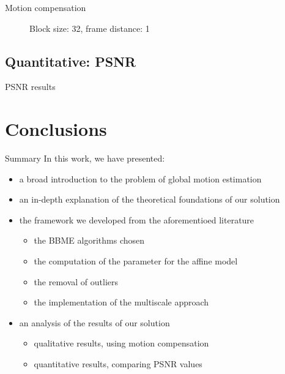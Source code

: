 \documentclass[aspectratio=1610,xcolor=dvipsnames]{beamer}
\begin{document}
\begin{frame}{Motion compensation}
\begin{figure}[htbp]
        \caption{Block size: 32, frame distance: 1}
    \end{figure}
\end{frame}

\subsection{Quantitative: PSNR}
\begin{frame}{PSNR results}
    \begin{table}
        \label{tab:psnr}
        
        \caption{PSNR result on a some example video sequences}
    \end{table}    
\end{frame}


\section{Conclusions}
\begin{frame}
    \begin{block}{Summary}
        In this work, we have presented:
        \begin{itemize}
            \item a broad introduction to the problem of global motion estimation
            \item an in-depth explanation of the theoretical foundations of our solution
            \item the framework we developed from the aforementioed literature
            \begin{itemize}
                \item the BBME algorithms chosen
                \item the computation of the parameter for the affine model
                \item the removal of outliers
                \item the implementation of the multiscale approach
            \end{itemize}
            \item an analysis of the results of our solution
            \begin{itemize}
                \item qualitative results, using motion compensation
                \item quantitative results, comparing PSNR values
            \end{itemize} 
        \end{itemize}        
    \end{block}
\end{frame}
\end{document}
